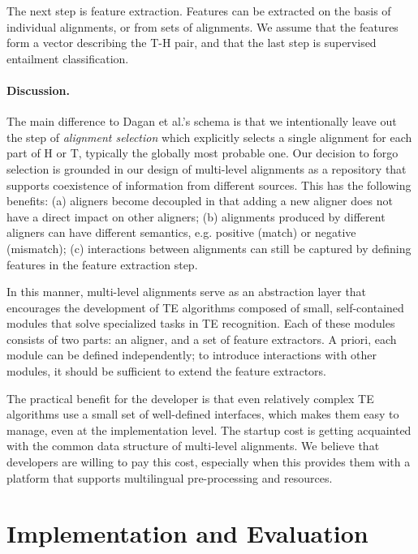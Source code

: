 \documentclass[11pt,letterpaper]{article}
\begin{document}
The next step is feature extraction. Features can be extracted on the
basis of individual alignments, or from sets of alignments. We assume
that the features form a vector describing the T-H pair, and that the
last step is supervised entailment classification.

\paragraph{Discussion.} The main difference to Dagan et al.'s schema
is that we intentionally leave out the step of {\em alignment
  selection} which explicitly selects a single alignment for each part
of H or T, typically the globally most probable one.  Our decision to
forgo selection is grounded in our design of multi-level alignments as
a repository that supports coexistence of information from different
sources. This has the following benefits: (a) aligners become
decoupled in that adding a new aligner does not have a direct impact
on other aligners;
(b) alignments produced by different aligners
can have different semantics, e.g. positive (match) or negative
(mismatch); (c) interactions between alignments can still be captured
by defining features in the feature extraction step.

In this manner, multi-level alignments serve as an abstraction layer
that encourages the development of TE algorithms composed of small,
self-contained modules that solve specialized tasks in TE
recognition. Each of these modules consists of two parts: an aligner,
and a set of feature extractors. A priori, each module can be defined
independently; to introduce interactions with other modules, it should
be sufficient to extend the feature extractors.

The practical benefit for the developer is that even relatively
complex TE algorithms use a small set of well-defined interfaces,
which makes them easy to manage, even at the implementation level. The
startup cost is getting acquainted with the common data structure of
multi-level alignments. We believe that developers are willing to pay
this cost, especially when this provides them with a platform that
supports multilingual pre-processing and resources. 

\section{Implementation and Evaluation}
\label{sec:impl}
\end{document}
